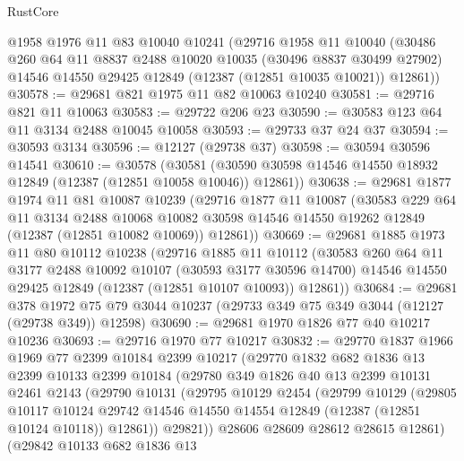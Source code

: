 \begin{lexlean}{RustCore}
\begin{coremodule}
    @1958
    @1976
    @11
    @83
    @10040
    @10241
    (@29716
      @1958
      @11
      @10040
      (@30486
        @260
        @64
        @11
        @8837
        @2488
        @10020
        @10035
        (@30496 @8837 @30499 @27902)
        @14546
        @14550
        @29425
        @12849
        (@12387 (@12851 @10035 @10021))
        @12861))
@30578 := @29681 @821 @1975 @11 @82 @10063 @10240
@30581 := @29716 @821 @11 @10063
@30583 := @29722 @206 @23
@30590 := @30583 @123 @64 @11 @3134 @2488 @10045 @10058
@30593 := @29733 @37 @24 @37
@30594 := @30593 @3134
@30596 := @12127 (@29738 @37)
@30598 := @30594 @30596 @14541
@30610 := @30578
    (@30581 (@30590 @30598 @14546 @14550 @18932 @12849 (@12387 (@12851 @10058 @10046)) @12861))
@30638 := @29681
    @1877
    @1974
    @11
    @81
    @10087
    @10239
    (@29716
      @1877
      @11
      @10087
      (@30583
        @229
        @64
        @11
        @3134
        @2488
        @10068
        @10082
        @30598
        @14546
        @14550
        @19262
        @12849
        (@12387 (@12851 @10082 @10069))
        @12861))
@30669 := @29681
    @1885
    @1973
    @11
    @80
    @10112
    @10238
    (@29716
      @1885
      @11
      @10112
      (@30583
        @260
        @64
        @11
        @3177
        @2488
        @10092
        @10107
        (@30593 @3177 @30596 @14700)
        @14546
        @14550
        @29425
        @12849
        (@12387 (@12851 @10107 @10093))
        @12861))
@30684 := @29681
    @378
    @1972
    @75
    @79
    @3044
    @10237
    (@29733 @349 @75 @349 @3044 (@12127 (@29738 @349)) @12598)
@30690 := @29681 @1970 @1826 @77 @40 @10217 @10236
@30693 := @29716 @1970 @77 @10217
@30832 := @29770
    @1837
    @1966
    @1969
    @77
    @2399
    @10184
    @2399
    @10217
    (@29770
      @1832
      @682
      @1836
      @13
      @2399
      @10133
      @2399
      @10184
      (@29780
        @349
        @1826
        @40
        @13
        @2399
        @10131
        @2461
        @2143
        (@29790
          @10131
          (@29795
            @10129
            @2454
            (@29799
              @10129
              (@29805
                @10117
                @10124
                @29742
                @14546
                @14550
                @14554
                @12849
                (@12387 (@12851 @10124 @10118))
                @12861))
            @29821))
        @28606
        @28609
        @28612
        @28615
        @12861)
      (@29842
        @10133
        @682
        @1836
        @13

\end{coremodule}
\end{lexlean}
